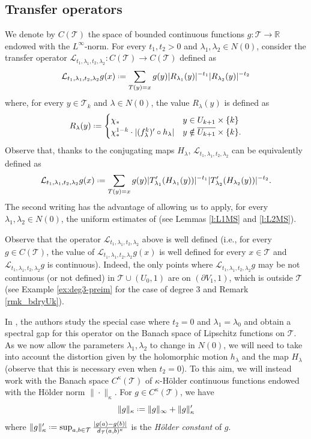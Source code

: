 \documentclass[11pt]{amsart}
\theoremstyle{plain}
\theoremstyle{definition}
\theoremstyle{remark}
\newcommand*{\defeq}{\mathrel{\vcenter{\baselineskip0.5ex \lineskiplimit0pt
			\hbox{\scriptsize.}\hbox{\scriptsize.}}}%
	=}
\begin{document}
\subsection{Transfer operators} \label{sec_3.3_to}
We denote by $C(\mathcal T)$ the space of bounded continuous functions $g\colon \mathcal T\to \mathbb R$ endowed 
with the $L^\infty$-norm.
For every $t_1,t_2>0$ and $\lambda_1, \lambda_2 \in N(0)$,
consider the transfer operator $\mathcal L_{t_1,\lambda_1,t_2, \lambda_2} \colon C(\mathcal T) \to C(\mathcal T)$ defined as
\begin{equation*}
\mathcal L_{t_1,\lambda_1, t_2,\lambda_2} g(x)
\defeq
\sum_{T(y)=x}
g(y)
|  R_{\lambda_1} (y) |^{-t_1}
|  R_{\lambda_2} (y) |^{-t_2}
\end{equation*}
where, for 
every
$y \in \mathcal{T}_k$ and $\lambda\in N(0)$,
the value $R_\lambda(y)$ is defined as
\[
R_\lambda (y) \defeq \begin{cases}
\chi_* & y\in U_{k+1}\times \{k\}\\
\chi_*^{1-k}  \cdot 
|(f_\lambda^k)'\circ h_\lambda| & y\notin \overline{U_{k+1}}\times \{k\}.
\end{cases}
\]
Observe that, thanks to the conjugating 
maps
$H_\lambda$, 
$\mathcal L_{t_1,\lambda_1, t_2, \lambda_2}$
can be equivalently
defined
as
\[
\mathcal L_{t_1,\lambda_1, t_2, \lambda_2} g(x)
\defeq
\sum_{T (y)= x}
g(y)
|  T_{\lambda_1}' (H_{\lambda_1} (y)) |^{-t_1}
|  T_{\lambda_2}' (H_{\lambda_2} (y)) |^{-t_2}.
\]
The second writing has the advantage of allowing us to apply, for
every $\lambda_1, \lambda_2 \in N(0)$, the uniform estimates of \cite{MakSmir03} (see Lemmas \ref{l:L1MS} and \ref{l:L2MS}). 

\medskip

Observe that the operator $\mathcal L_{t_1,\lambda_1, t_2, \lambda_2}$
above is well defined
(i.e., for every $g\in C(\mathcal T)$,
the value of 
$\mathcal L_{t_1,\lambda_1, t_2, \lambda_2} g(x)$ is well defined for every $x\in \mathcal T$
and $\mathcal L_{t_1,\lambda_1, t_2, \lambda_2} g$
is continuous).
Indeed, the only points where $\mathcal L_{t_1,\lambda_1, t_2, \lambda_2} g$ 
may be not continuous (or not defined)
in  $\mathcal T \cup (U_0,1)$ are on 
$(\partial V_1,1)$, which is outside $\mathcal T$
(see Example \ref{ex:deg3-preim} for the case of degree $3$ and Remark \ref{rmk_bdryUk}).

\medskip

In \cite{MakSmir03}, the authors study the
special
case where
$t_2=0$ and 
$\lambda_1=\lambda_0$
and obtain a spectral gap for this operator on the Banach space of 
Lipschitz
functions on $\mathcal T$.
As we now allow the parameters 
$\lambda_1,\lambda_2$
to change
in $N(0)$, we will need to take into account the distortion given by the holomorphic motion $h_\lambda$ and the map $H_\lambda$
(observe that this is necessary even when $t_2=0$).
To this aim,
we will instead
work with the Banach space
$C^{\kappa}(\mathcal T)$
of $\kappa$-H\"older continuous functions endowed with the H\"older norm $\|\cdot\|_\kappa$. 
For $g \in C^{\kappa}(\mathcal T)$, we have
\[\|g\|_{\kappa} \defeq \|g\|_{\infty} +\|g\|'_{\kappa}\]
where $\|g\|'_{\kappa}\defeq \sup_{a,b\in \mathcal T} \frac{|g(a)-g(b)|}{d_{\mathcal T} (a,b)^\kappa}$
is the \emph{H\"older constant} of $g$.
\end{document}
